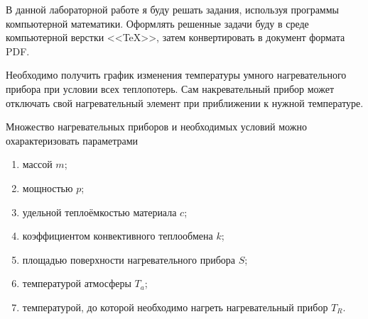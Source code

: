 \documentclass[a4paper, 14pt, titlepage, fleqn]{extarticle}
\begin{document}
	\tableofcontents
	\newpage

    \onehalfspacing
    

        В данной лабораторной работе я буду решать задания, используя программы компьютерной математики. 
        Оформлять решенные задачи буду в среде компьютерной верстки <<\TeX>>, затем конвертировать в документ формата PDF.
        

            Необходимо получить график изменения температуры умного нагревательного прибора при условии всех теплопотерь. 
            Сам накревательный прибор может отключать свой нагревательный элемент при приближении к нужной температуре.
        
            Множество нагревательных приборов и необходимых условий можно охарактеризовать параметрами
            
            \begin{enumerate}
                \item массой $m$;
                \item мощностью $p$;
                \item удельной теплоёмкостью материала $c$;
                \item коэффициентом конвективного теплообмена $k$;
                \item площадью поверхности нагревательного прибора $S$;
                \item температурой атмосферы $T_a$;
                \item температурой, до которой необходимо нагреть нагревательный прибор $T_R$.
            \end{enumerate}
\end{document}
